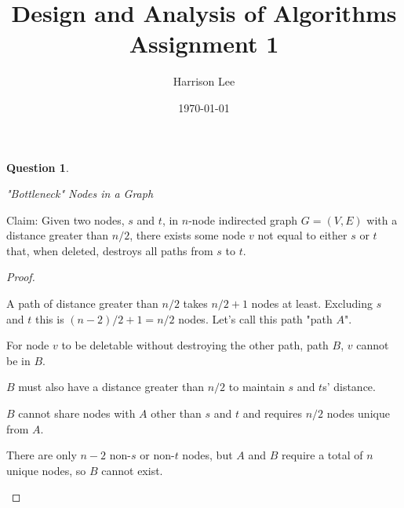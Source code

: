 \documentclass[11pt, oneside]{article}   	%
\title {Design and Analysis of Algorithms Assignment 1}
\author{Harrison Lee}
\date{\today}
\newtheorem{Question}{Question}
\begin{document}
\maketitle

\begin{Question} %
\begin{description}
"Bottleneck" Nodes in a Graph
\end{description}
\end{Question}

Claim: Given two nodes, $s$ and $t$, in $n$-node indirected graph $G = (V, E)$ with a distance greater than $n/2$, there exists some node $v$ not equal to either $s$ or $t$ that, when deleted, destroys all paths from $s$ to $t$.




\begin{proof}
\begin{description}

A path of distance greater than $n/2$ takes $n/2 + 1$ nodes at least. Excluding $s$ and $t$ this is $(n-2)/2 + 1= n/2$ nodes. Let's call this path "path $A$".

For node $v$ to be deletable without destroying the other path, path $B$, $v$ cannot be in $B$.

$B$ must also have a distance greater than $n/2$ to maintain $s$ and $t$s' distance.

$B$ cannot share nodes with $A$ other than $s$ and $t$ and requires $n/2$ nodes unique from $A$.

There are only $n-2$ non-$s$ or non-$t$ nodes, but $A$ and $B$ require a total of $n$ unique nodes, so $B$ cannot exist.


\end{description}
\end{proof}
\end{document}
